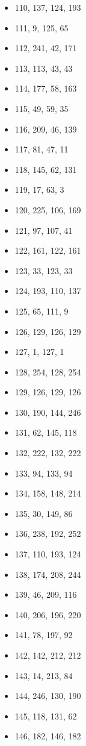 \documentclass[12pt, fleqn]{report}                             %
\theoremstyle{break}                                            %
\begin{document}
\begin{itemize}
        \item 110, 137, 124, 193
        \item 111, 9, 125, 65
        \item 112, 241, 42, 171
        \item 113, 113, 43, 43
        \item 114, 177, 58, 163
        \item 115, 49, 59, 35
        \item 116, 209, 46, 139
        \item 117, 81, 47, 11
        \item 118, 145, 62, 131
        \item 119, 17, 63, 3
        \item 120, 225, 106, 169
        \item 121, 97, 107, 41
        \item 122, 161, 122, 161
        \item 123, 33, 123, 33
        \item 124, 193, 110, 137
        \item 125, 65, 111, 9
        \item 126, 129, 126, 129
        \item 127, 1, 127, 1
        \item 128, 254, 128, 254
        \item 129, 126, 129, 126
        \item 130, 190, 144, 246
        \item 131, 62, 145, 118
        \item 132, 222, 132, 222
        \item 133, 94, 133, 94
        \item 134, 158, 148, 214
        \item 135, 30, 149, 86
        \item 136, 238, 192, 252
        \item 137, 110, 193, 124
        \item 138, 174, 208, 244
        \item 139, 46, 209, 116
        \item 140, 206, 196, 220
        \item 141, 78, 197, 92
        \item 142, 142, 212, 212
        \item 143, 14, 213, 84
        \item 144, 246, 130, 190
        \item 145, 118, 131, 62
        \item 146, 182, 146, 182

\end{itemize}
\end{document}

